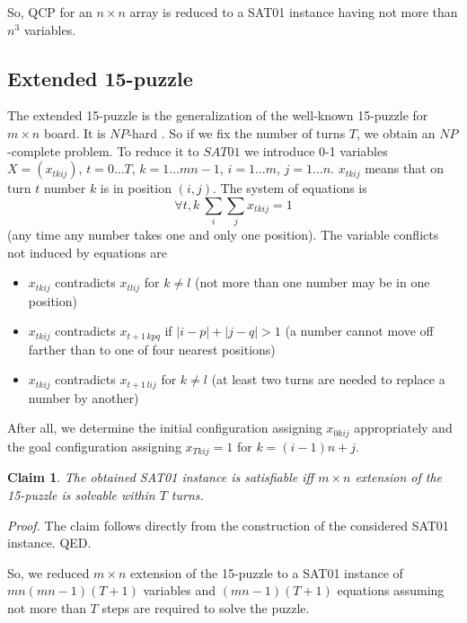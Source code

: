 \documentclass[11pt]{article}
\newtheorem{claim}{Claim}
\begin{document}
So, QCP for an $n \times n$ array is reduced to a SAT01 instance having not more than $n^3$ variables.

\subsection{Extended 15-puzzle}
The extended 15-puzzle is the generalization of the well-known 15-puzzle for $m \times n$ board. It is $NP$-hard \cite{RW90}. So if we fix the number of turns $T$, we obtain an $NP$-complete problem. To reduce it to $SAT01$ we introduce 0-1 variables $X=(x_{tkij})$, $t=0 \ldots T$, $k=1 \ldots mn-1$, $i=1 \ldots m$, $j=1 \ldots n$. $x_{tkij}$ means that on turn $t$ number $k$ is in position $(i,j)$. The system of equations is
\begin{equation}
\label{eq:e152sat01}
\forall t,k \ \sum_i \sum_j x_{tkij} =1
\end{equation}
(any time any number takes one and only one position). The variable conflicts not induced by equations are
\begin{itemize}
\item $x_{tkij}$ contradicts $x_{tlij}$ for $k \ne l$ (not more than one number may be in one position)
\item $x_{tkij}$ contradicts $x_{t+1\,kpq}$ if $|i-p|+|j-q|>1$ (a number cannot move off farther than to one of four nearest positions)
\item $x_{tkij}$ contradicts $x_{t+1\,lij}$ for $k \ne l$ (at least two turns are needed to replace a number by another)
\end{itemize}

After all, we determine the initial configuration assigning $x_{0kij}$ appropriately and the goal configuration assigning $x_{Tkij}=1$ for $k=(i-1)n+j$.
\begin{claim}
The obtained SAT01 instance is satisfiable iff $m \times n$ extension of the 15-puzzle is solvable within $T$ turns.
\end{claim}

{\em Proof.\/} The claim follows directly from the construction of the considered SAT01 instance. QED.

So, we reduced $m \times n$ extension of the 15-puzzle to a SAT01 instance of $mn(mn-1)(T+1)$ variables and $(mn-1)(T+1)$ equations assuming not more than $T$ steps are required to solve the puzzle.
\end{document}
